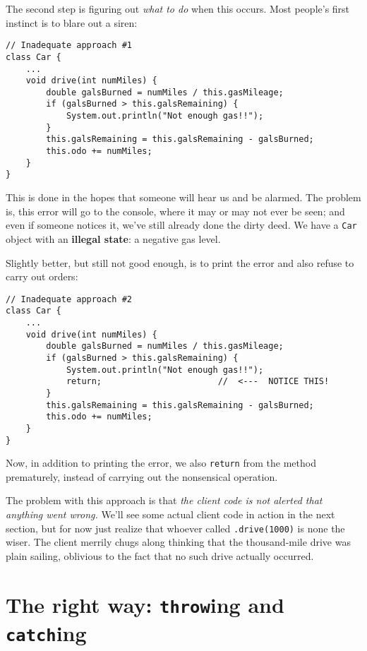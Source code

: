 The second step is figuring out \textit{what to do} when this occurs. Most
people's first instinct is to blare out a siren:

\begin{Verbatim}[samepage=true,fontsize=\footnotesize,frame=single]
// Inadequate approach #1
class Car {
    ...
    void drive(int numMiles) {
        double galsBurned = numMiles / this.gasMileage;
        if (galsBurned > this.galsRemaining) {
            System.out.println("Not enough gas!!");
        }
        this.galsRemaining = this.galsRemaining - galsBurned;
        this.odo += numMiles;
    }
}
\end{Verbatim}

This is done in the hopes that someone will hear us and be alarmed. The
problem is, this error will go to the console, where it may or may not ever be
seen; and even if someone notices it, we've still already done the dirty deed.
We have a \texttt{Car} object with an \textbf{illegal state}: a negative gas
level.

Slightly better, but still not good enough, is to print the error and also
refuse to carry out orders:

\begin{Verbatim}[samepage=true,fontsize=\footnotesize,frame=single]
// Inadequate approach #2
class Car {
    ...
    void drive(int numMiles) {
        double galsBurned = numMiles / this.gasMileage;
        if (galsBurned > this.galsRemaining) {
            System.out.println("Not enough gas!!");
            return;                       //  <---  NOTICE THIS!
        }
        this.galsRemaining = this.galsRemaining - galsBurned;
        this.odo += numMiles;
    }
}
\end{Verbatim}

Now, in addition to printing the error, we also \texttt{return} from the
method prematurely, instead of carrying out the nonsensical operation.

The problem with this approach is that \textit{the client code is not alerted
that anything went wrong.} We'll see some actual client code in action in the
next section, but for now just realize that whoever called
\texttt{.drive(1000)} is none the wiser. The client merrily chugs along
thinking that the thousand-mile drive was plain sailing, oblivious to the fact
that no such drive actually occurred.

\section{The right way: \texttt{throw}ing and \texttt{catch}ing}

